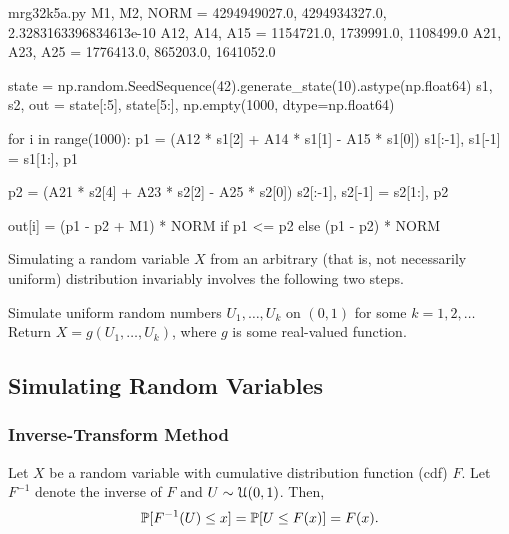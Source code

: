 \begin{Pcode}{mrg32k5a.py}
	M1, M2, NORM = 4294949027.0, 4294934327.0, 2.3283163396834613e-10
	A12, A14, A15 = 1154721.0, 1739991.0, 1108499.0
	A21, A23, A25 = 1776413.0, 865203.0, 1641052.0

	state = np.random.SeedSequence(42).generate_state(10).astype(np.float64)
	s1, s2, out = state[:5], state[5:], np.empty(1000, dtype=np.float64)

	for i in range(1000):
	p1 = (A12 * s1[2] + A14 * s1[1] - A15 * s1[0]) %
	s1[:-1], s1[-1] = s1[1:], p1

	p2 = (A21 * s2[4] + A23 * s2[2] - A25 * s2[0]) %
	s2[:-1], s2[-1] = s2[1:], p2

	out[i] = (p1 - p2 + M1) * NORM if p1 <= p2 else (p1 - p2) * NORM
\end{Pcode}

Simulating a random variable \(X\) from an arbitrary (that is, not necessarily uniform) distribution invariably involves the following two steps.
\begin{algorithm}[H]
	\caption{Simulation of Random Variable \(X\)}\label{alg:SimulationRandomVariableX}
	\begin{algorithmic}[1]
		\State{} Simulate uniform random numbers \(U_1, \dots, U_k\) on \((0, 1)\) for some \(k = 1, 2, \dots\)
		\State{} Return \(X = g(U_1, \dots, U_k)\), where \(g\) is some real-valued function.
	\end{algorithmic}
\end{algorithm}

\subsection{Simulating Random Variables}

\subsubsection{Inverse-Transform Method}
Let \(X\) be a random variable with cumulative distribution function (cdf) \(F\). Let \(F^{-1}\) denote the inverse of \(F\) and \(U \sim \EuScript{U}(0, 1)\). Then,
\begin{equation}
	\mathbb{P}[F^{-1}(U) \le x] = \mathbb{P}[U \le F(x)] = F(x).
\end{equation}

